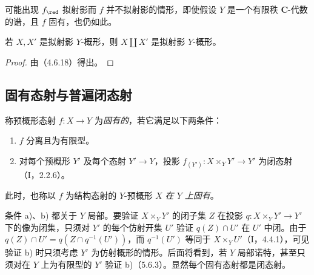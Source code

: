 可能出现 $f_{\red}$ 拟射影而 $f$ 并不拟射影的情形，即使假设 $Y$ 是一个有限秩 $\mathbf C$-代数的谱，且 $f$ 固有，也仍如此。

若 $X,X'$ 是拟射影 $Y$-概形，则 $X\amalg X'$ 是拟射影 $Y$-概形。
\begin{proof}
由（4.6.18）得出。
\end{proof}

\subsection{固有态射与普遍闭态射}

称预概形态射 $f:X\to Y$ 为\emph{固有的}，若它满足以下两条件：
\begin{enumerate}[label=\alph*)]
\item $f$ 分离且为有限型。
\item 对每个预概形 $Y'$ 及每个态射 $Y'\to Y$，投影
$f_{(Y')}:X\times_Y Y'\to Y'$ 为闭态射（I，2.2.6）。
\end{enumerate}
此时，也称以 $f$ 为结构态射的 $Y$-预概形 $X$ \emph{在 $Y$ 上固有}。

条件 a)、b) 都关于 $Y$ 局部。要验证 $X\times_Y Y'$ 的闭子集 $Z$ 在投影
$q:X\times_Y Y'\to Y'$ 下的像为闭集，只须对 $Y'$ 的每个仿射开集 $U'$ 验证 $q(Z)\cap U'$ 在 $U'$ 中闭。由于
$q(Z)\cap U'=q(Z\cap q^{-1}(U'))$，而 $q^{-1}(U')$ 等同于 $X\times_Y U'$（I，4.4.1），可见验证 b) 时只须考虑 $Y'$ 为仿射概形的情形。后面将看到，若 $Y$ 局部诺特，甚至只须对在 $Y$ 上为有限型的 $Y'$ 验证 b)（5.6.3）。显然每个固有态射都是闭态射。

